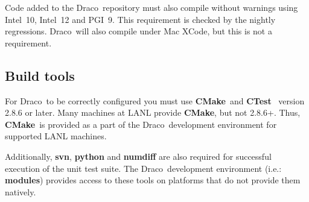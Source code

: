 \documentclass[11pt]{nmemo}
\newcommand{\comp}[1]{\normalfont\footnotesize\texttt{#1}\normalsize}
\newcommand{\draco}{{\normalfont\sffamily Draco}}
\newcommand{\cmake}{{\normalfont\bfseries CMake}}
\newcommand{\ctest}{{\normalfont\bfseries CTest}}
\begin{document}
Code added to the \draco\ repository must also compile without
warnings using Intel~10, Intel~12 and PGI~9.  This requirement is checked by the
nightly regressions.  \draco\ will also compile under Mac XCode, but
this is not a requirement.

\subsection{Build tools}

For \draco\ to be correctly configured you must use \cmake\ and
\ctest~\cite{cmake} version 2.8.6 or later.  Many machines at LANL
provide \cmake, but not 2.8.6+.  Thus, \cmake\ is provided as a part
of the \draco\ development environment for supported LANL machines.

Additionally, \textbf{svn}, \textbf{python} and \textbf{numdiff} are
also required for successful execution of the unit test suite. The
\draco\ development environment (i.e.: \textbf{modules}) provides
access to these tools on platforms that do not provide them natively.





%
\end{document}
